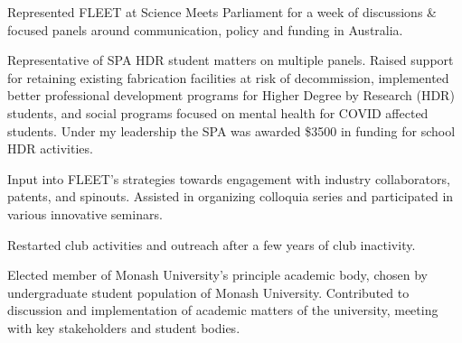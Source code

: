 \documentclass[10pt,a4paper,ragged2e,withhyper]{altacv}
\begin{document}
		

		\vspace{-1em}
		
		Represented FLEET at Science Meets Parliament for a week of discussions \& focused panels around communication, policy and funding in Australia.
		
		\divider
		
		Representative of SPA HDR student matters on multiple panels. Raised support for retaining existing fabrication facilities at risk of decommission, implemented better professional development programs for Higher Degree by Research (HDR) students, and social programs focused on mental health for COVID affected students. Under my leadership the SPA was awarded \$3500 in funding for school HDR activities.
		
		\divider
		
		Input into FLEET’s strategies towards engagement with industry collaborators, patents, and spinouts. Assisted in organizing colloquia series and participated in various innovative seminars.
		
		\divider
		
		Restarted club activities and outreach after a few years of club inactivity.
		
		\divider
		
		Elected member of Monash University’s principle academic body, chosen by undergraduate student population of Monash University. Contributed to discussion and implementation of academic matters of the university, meeting with key stakeholders and student bodies.
		
\end{document}
